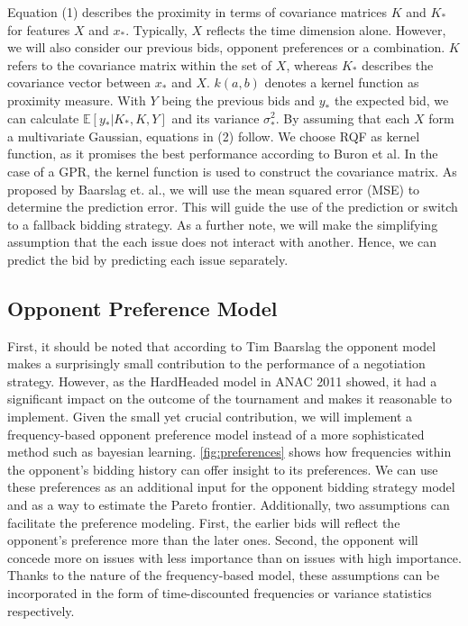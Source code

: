 \documentclass[a4paper,11pt]{article}
\theoremstyle{mytheor}
\begin{document}
Equation (1) describes the proximity in terms of covariance matrices $K$ and $K_*$ for features $X$ and $x_*$. Typically, $X$ reflects the time dimension alone. However, we will also consider our previous bids, opponent preferences or a combination. $K$ refers to the covariance matrix within the set of $X$, whereas $K_*$ describes the covariance vector between $x_*$ and $X$. $k(a,b)$ denotes a kernel function as proximity measure. With $Y$ being the previous bids and $y_*$ the expected bid, we can calculate $\mathbb{E}[y_*|K_*,K,Y]$ and its variance $\sigma_*^2$. By assuming that each $X$ form a multivariate Gaussian, equations in (2) follow. We choose RQF as kernel function, as it promises the best performance according to Buron et al.\cite{Buron_Guessoum_Ductor_2019} In the case of a GPR, the kernel function is used to construct the covariance matrix.
As proposed by Baarslag et. al., we will use the mean squared error (MSE) to determine the prediction error.\cite{Baarslag2016} This will guide the use of the prediction or switch to a fallback bidding strategy. As a further note, we will make the simplifying assumption that the each issue does not interact with another. Hence, we can predict the bid by predicting each issue separately. 

\subsection{Opponent Preference Model}
First, it should be noted that according to Tim Baarslag the opponent model makes a surprisingly small contribution to the performance of a negotiation strategy.\cite{Baarslag2014} However, as the HardHeaded model in ANAC 2011 showed, it had a significant impact on the outcome of the tournament and makes it reasonable to implement. Given the small yet crucial contribution, we will implement a frequency-based opponent preference model instead of a more sophisticated method such as bayesian learning. \autoref{fig:preferences} shows how frequencies within the opponent's bidding history can offer insight to its preferences. We can use these preferences as an additional input for the opponent bidding strategy model and as a way to estimate the Pareto frontier. 
Additionally, two assumptions can facilitate the preference modeling. First, the earlier bids will reflect the opponent's preference more than the later ones. Second, the opponent will concede more on issues with less importance than on issues with high importance.\cite{Baarslag2016} Thanks to the nature of the frequency-based model, these assumptions can be incorporated in the form of time-discounted frequencies or variance statistics respectively.
\end{document}
